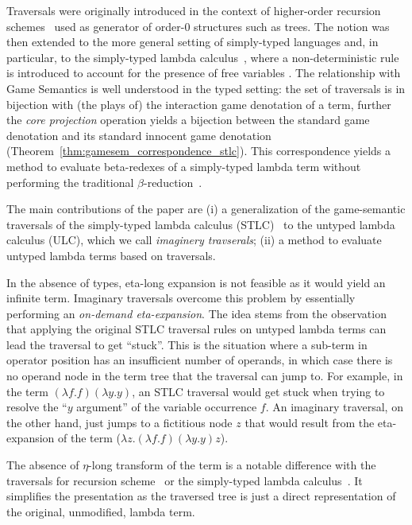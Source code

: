 \documentclass{elsarticle}
\theoremstyle{plain}
\theoremstyle{definition}
\theoremstyle{remark}
\begin{document}
Traversals were originally introduced in the context of higher-order recursion schemes~\cite{Ong2006} used as generator of order-$0$ structures such as trees.
The notion was then extended to the more general setting of simply-typed languages and, in particular, to the simply-typed lambda calculus~\cite{BlumPhd}, where a non-deterministic rule is introduced to account for the presence of free variables . The relationship with Game Semantics is well understood in the typed setting: the set of traversals is in bijection with (the plays of) the interaction game denotation of a term, further the \emph{core projection} operation yields a bijection between the standard game denotation and its standard innocent game denotation (Theorem~\ref{thm:gamesem_correspondence_stlc}). This correspondence yields a method to evaluate beta-redexes of a simply-typed lambda term without performing the traditional $\beta$-reduction~\cite{danos-head,BlumPhd,BlumGalop2008, Blum-LocalBeta2008}.

The main contributions of the paper are
(i) a generalization of the game-semantic traversals of the simply-typed lambda calculus (STLC)~\cite{BlumPhd} to the untyped lambda calculus (ULC), which we call \emph{imaginery travserals}; (ii) a method to evaluate untyped lambda terms based on traversals.

In the absence of types, eta-long expansion is not feasible as it would yield an infinite term. Imaginary traversals overcome this problem by essentially performing an \emph{on-demand eta-expansion}. The idea stems from the observation that applying the original STLC traversal rules on untyped lambda terms can lead the traversal to get ``stuck''. This is the situation where a sub-term in operator position has an insufficient number of operands, in which case there is no operand node in the term tree that the traversal can jump to.
For example,  in the term $(\lambda f.f)(\lambda y.y)$, an STLC traversal would get stuck when trying to resolve the ``$y$ argument'' of the variable occurrence $f$.
An imaginary traversal, on the other hand, just jumps to a fictitious node $z$ that would result from the eta-expansion of the term ($\lambda z. (\lambda f.f)(\lambda y.y) z$).

The absence of $\eta$-long transform of the term is a notable difference with the traversals for recursion scheme~\cite{Ong2006} or the simply-typed lambda calculus~\cite{BlumPhd}. It simplifies the presentation as the traversed tree is just a direct representation of the original, unmodified, lambda term.
\end{document}
